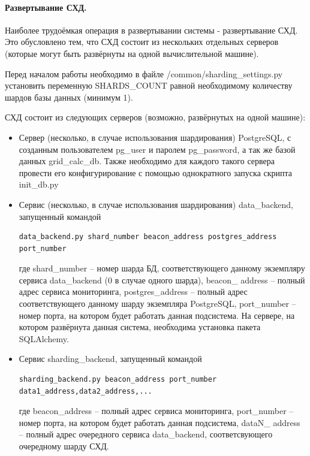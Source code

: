 \documentclass[a4paper,12pt]{report}
\numberwithin{equation}{section}
\begin{document}
  \paragraph{Развертывание СХД.}
  Наиболее трудоёмкая операция в развертывании системы - развертывание СХД. 
  Это обусловлено тем, что СХД состоит из нескольких отдельных серверов (которые могут быть развёрнуты на одной вычислительной машине).
  
  Перед началом работы необходимо в файле /common/sharding\_settings.py установить переменную SHARDS\_COUNT равной необходимому количеству шардов базы данных (минимум 1).
  
  СХД состоит из следующих серверов (возможно, развёрнутых на одной машине):
  \begin{itemize}
    \item Сервер (несколько, в случае использования шардирования) PostgreSQL, с созданным пользователем pg\_user и паролем pg\_password, а так же базой данных grid\_calc\_db. Также необходимо для каждого такого сервера провести его конфигурирование с помощью однократного запуска скрипта init\_db.py
    \item Сервис (несколько, в случае использования шардирования) data\_backend, запущенный командой
    \begin{lstlisting}[numbers=none]
    data_backend.py shard_number beacon_address postgres_address port_number
    \end{lstlisting}
    где shard\_number -- номер шарда БД, соответствующего данному экземпляру сервиса data\_backend (0 в случае одного шарда),
    beacon\_ address -- полный адрес сервиса мониторинга,
    postgres\_address -- полный адрес соответствующего данному шарду экземпляра PostgreSQL, 
    port\_number -- номер порта, на котором будет работать данная подсистема.
    На сервере, на котором развёрнута данная система, необходима установка пакета SQLAlchemy.
    \item Сервис sharding\_backend, запущенный командой
    \begin{lstlisting}[numbers=none]
    sharding_backend.py beacon_address port_number data1_address,data2_address,...
    \end{lstlisting}
    где beacon\_address -- полный адрес сервиса мониторинга,
    port\_number -- номер порта, на котором будет работать данная подсистема,
    dataN\_ address -- полный адрес очередного сервиса data\_backend, соответсвующего очередному шарду СХД.
  \end{itemize}
  
\end{document}
